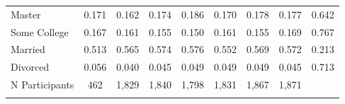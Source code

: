 \begin{center}
\begin{tabular}{lcccccccc}
Master & 0.171 & 0.162 & 0.174 & 0.186 & 0.170 & 0.178 & 0.177 & 0.642\\
Some College & 0.167 & 0.161 & 0.155 & 0.150 & 0.161 & 0.155 & 0.169 & 0.767\\
Married & 0.513 & 0.565 & 0.574 & 0.576 & 0.552 & 0.569 & 0.572 & 0.213\\
Divorced & 0.056 & 0.040 & 0.045 & 0.049 & 0.049 & 0.049 & 0.045 & 0.713\\
N Participants & 462 & 1,829 & 1,840 & 1,798 & 1,831 & 1,867 & 1,871 & \\
\noalign{\smallskip}\hline\end{tabular}\\
\end{center}
